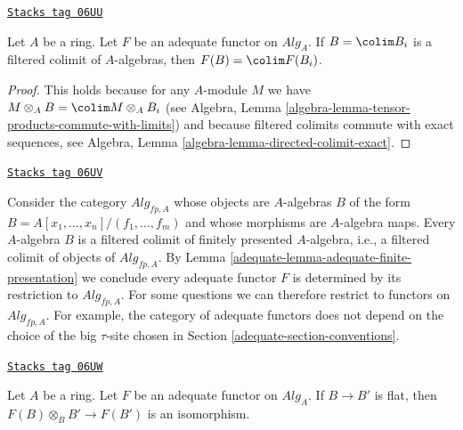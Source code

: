 \begin{lemma}
\label{adequate-lemma-adequate-finite-presentation}
\href{https://stacks.math.columbia.edu/tag/06UU}{\texttt{Stacks tag 06UU}}

Let $A$ be a ring.
Let $F$ be an adequate functor on $\textit{Alg}_A$.
If $B = \colim B_i$ is a filtered
colimit of $A$-algebras, then $F(B) = \colim F(B_i)$.
\end{lemma}

\begin{proof}
This holds because for any $A$-module $M$ we have
$M \otimes_A B = \colim M \otimes_A B_i$ (see
Algebra, Lemma \ref{algebra-lemma-tensor-products-commute-with-limits})
and because filtered colimits commute with exact sequences, see
Algebra, Lemma \ref{algebra-lemma-directed-colimit-exact}.
\end{proof}

\begin{remark}[Settheoretic]
\label{adequate-remark-settheoretic}
\href{https://stacks.math.columbia.edu/tag/06UV}{\texttt{Stacks tag 06UV}}

Consider the category $\textit{Alg}_{fp, A}$ whose objects are $A$-algebras
$B$ of the form $B = A[x_1, \ldots, x_n]/(f_1, \ldots, f_m)$ and whose
morphisms are $A$-algebra maps. Every $A$-algebra $B$ is a filtered colimit
of finitely presented $A$-algebra, i.e., a filtered colimit of objects of
$\textit{Alg}_{fp, A}$. By
Lemma \ref{adequate-lemma-adequate-finite-presentation}
we conclude every adequate functor $F$ is determined by its restriction to
$\textit{Alg}_{fp, A}$. For some questions we can therefore restrict to
functors on $\textit{Alg}_{fp, A}$. For example, the category of adequate
functors does not depend on the choice of the big $\tau$-site
chosen in
Section \ref{adequate-section-conventions}.
\end{remark}

\begin{lemma}
\label{adequate-lemma-adequate-flat}
\href{https://stacks.math.columbia.edu/tag/06UW}{\texttt{Stacks tag 06UW}}

Let $A$ be a ring.
Let $F$ be an adequate functor on $\textit{Alg}_A$.
If $B \to B'$ is flat, then $F(B) \otimes_B B' \to F(B')$
is an isomorphism.
\end{lemma}

